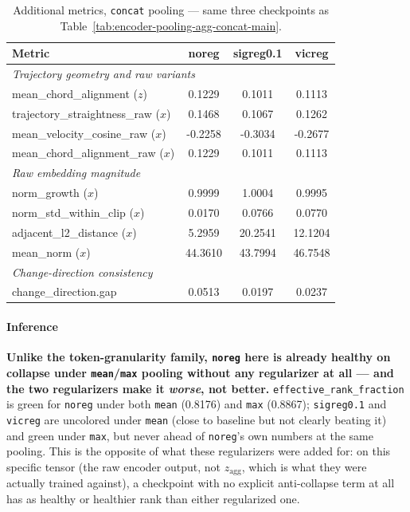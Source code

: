 \begin{table}[H]
\centering
\caption{Additional metrics, \texttt{concat} pooling --- same three checkpoints as
Table~\ref{tab:encoder-pooling-agg-concat-main}.}
\label{tab:encoder-pooling-agg-concat-additional}
\begin{tabular}{lccc}
\toprule
Metric & noreg & sigreg0.1 & vicreg \\
\midrule
\multicolumn{4}{l}{\textit{Trajectory geometry and raw variants}} \\
mean\_chord\_alignment ($z$) & 0.1229 & 0.1011 & 0.1113 \\
trajectory\_straightness\_raw ($x$) & 0.1468 & 0.1067 & 0.1262 \\
mean\_velocity\_cosine\_raw ($x$) & -0.2258 & -0.3034 & -0.2677 \\
mean\_chord\_alignment\_raw ($x$) & 0.1229 & 0.1011 & 0.1113 \\
\midrule
\multicolumn{4}{l}{\textit{Raw embedding magnitude}} \\
norm\_growth ($x$) & 0.9999 & 1.0004 & 0.9995 \\
norm\_std\_within\_clip ($x$) & 0.0170 & 0.0766 & 0.0770 \\
adjacent\_l2\_distance ($x$) & 5.2959 & 20.2541 & 12.1204 \\
mean\_norm ($x$) & 44.3610 & 43.7994 & 46.7548 \\
\midrule
\multicolumn{4}{l}{\textit{Change-direction consistency}} \\
change\_direction.gap & 0.0513 & 0.0197 & 0.0237 \\
\bottomrule
\end{tabular}
\end{table}

\paragraph{Inference}

\textbf{Unlike the token-granularity family, \texttt{noreg} here is already healthy on
collapse under \texttt{mean}/\texttt{max} pooling without any regularizer at all --- and
the two regularizers make it \emph{worse}, not better.} \texttt{effective\_rank\_fraction}
is green for \texttt{noreg} under both \texttt{mean} (0.8176) and \texttt{max} (0.8867);
\texttt{sigreg0.1} and \texttt{vicreg} are uncolored under \texttt{mean} (close to
baseline but not clearly beating it) and green under \texttt{max}, but never ahead of
\texttt{noreg}'s own numbers at the same pooling. This is the opposite of what these
regularizers were added for: on this specific tensor (the raw encoder output, not
$z_{\mathrm{agg}}$, which is what they were actually trained against), a checkpoint with
no explicit anti-collapse term at all has as healthy or healthier rank than either
regularized one.

